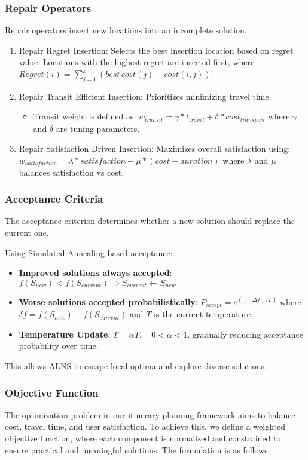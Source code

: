 \documentclass{ecai}
\begin{document}
\subsubsection{Repair Operators}
Repair operators insert new locations into an incomplete solution.
\begin{enumerate}
    \item Repair Regret Insertion: Selects the best insertion location based on regret value. Locations with the highest regret are inserted first, where $Regret(i) = \sum_{j=1}^{k}(best \, cost(j) - cost(i, j))$.
    \item Repair Transit Efficient Insertion: Prioritizes minimizing travel time.
    \begin{itemize}
        \item Transit weight is defined as:
        $
            w_{transit} = \gamma * t_{travel} + \delta * cost_{transport}
        $
        where $\gamma$ and $\delta$ are tuning parameters.
    \end{itemize}
    \item Repair Satisfaction Driven Insertion: Maximizes overall satisfaction using: $w_{satisfaction} = \lambda * satisfaction - \mu * (cost + duration)$ where $\lambda$ and $\mu$ balances satisfaction vs cost.
\end{enumerate}

\subsubsection{Acceptance Criteria}
The acceptance criterion determines whether a new solution should replace the current one.

Using Simulated Annealing-based acceptance:
\begin{itemize}
    \item \textbf{Improved solutions always accepted}: $f(S_{new}) < f(S_{current}) \Rightarrow S_{current} \leftarrow S_{new}$
    \item \textbf{Worse solutions accepted probabilistically}: $P_{accept} = e^{((-\Delta f ) / T)}$ where $\delta f = f(S_{new}) - f(S_{current})$ and $T$ is the current temperature.
    \item \textbf{Temperature Update}: $T = \alpha T, \quad 0 < \alpha < 1$. gradually reducing acceptance probability over time.
\end{itemize}

This allows ALNS to escape local optima and explore diverse solutions.

\subsubsection{Objective Function}
The optimization problem in our itinerary planning framework aims to balance cost, travel time, and user satisfaction. To achieve this, we define a weighted objective function, where each component is normalized and constrained to ensure practical and meaningful solutions. The formulation is as follows:
\end{document}
